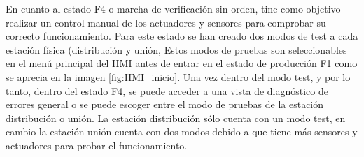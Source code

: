 En cuanto al estado F4 o marcha de verificación sin orden, tine como objetivo realizar un control manual de los actuadores y sensores para comprobar su correcto funcionamiento. Para este estado se han creado dos modos de test a cada estación física (distribución y unión, Estos modos de pruebas son seleccionables en el menú principal del HMI antes de entrar en el estado de producción F1 como se aprecia en la imagen \ref{fig:HMI_inicio}. Una vez dentro del modo test, y por lo tanto, dentro del estado F4, se puede acceder a una vista de diagnóstico de errores general o  se puede escoger entre el modo de pruebas de la estación distribución o unión. La estación distribución sólo cuenta con un modo test, en cambio la estación unión cuenta con dos modos debido a que tiene más sensores y actuadores para probar el funcionamiento.

